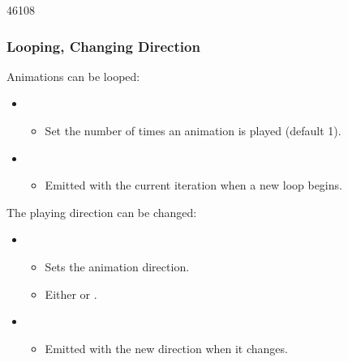 \begin{slide}{46108}\frametitle{Looping, Changing Direction}
\vspace*{0.5em}
Animations can be looped:

\begin{itemize}
\item {}
\begin{itemize}
\item Set the number of times an animation is played (default 1).
\end{itemize}
\item {}
\begin{itemize}
\item Emitted with the current iteration when a new loop begins.
\end{itemize}
\end{itemize}

The playing direction can be changed:

\begin{itemize}
\item {}
\begin{itemize}
\item Sets the animation direction.
\item Either  or .
\end{itemize}
\item {}
\begin{itemize}
\item Emitted with the new direction when it changes.
\end{itemize}
\end{itemize}

\end{slide}



